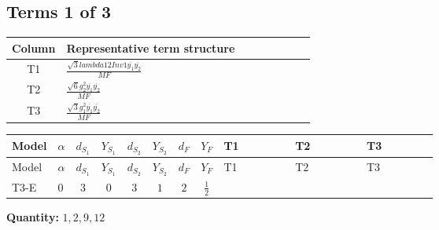 \documentclass[8pt]{article}
\begin{document}
\begin{landscape}
\subsection*{Terms 1 of 3}
\begin{center}
\begin{tabular}{@{}c >{\raggedright\arraybackslash}p{0.82\linewidth}@{}}
\toprule
Column & Representative term structure \\
\midrule
T1 & \(\displaystyle \frac{\sqrt{3} lambda12Inv1 \overline{y_{1}} \overline{y_{2}}}{MF}\) \\
\midrule
T2 & \(\displaystyle \frac{\sqrt{6} g_{2}^{2} \overline{y_{1}} \overline{y_{2}}}{MF}\) \\
\midrule
T3 & \(\displaystyle \frac{\sqrt{3} g_{1}^{2} \overline{y_{1}} \overline{y_{2}}}{MF}\) \\
\midrule
\bottomrule
\end{tabular}
\end{center}
\smallskip
\tiny
\begin{longtable}{@{}llcccccc >{\raggedright\arraybackslash}p{0.21\linewidth} >{\raggedright\arraybackslash}p{0.21\linewidth} >{\raggedright\arraybackslash}p{0.21\linewidth}@{}}
\toprule
Model & $\alpha$ & $d_{S_1}$ & $Y_{S_1}$ & $d_{S_2}$ & $Y_{S_2}$ & $d_F$ & $Y_F$ & T1 & T2 & T3 \\
\midrule
\endfirsthead
\toprule
Model & $\alpha$ & $d_{S_1}$ & $Y_{S_1}$ & $d_{S_2}$ & $Y_{S_2}$ & $d_F$ & $Y_F$ & T1 & T2 & T3 \\
\midrule
\endhead
T3-E & $0$ & $3$ & $0$ & $3$ & $1$ & $2$ & $\frac{1}{2}$ & \scriptsize\adjustbox{max width=\linewidth}{$\begin{gathered} - \frac{\sqrt{3} lambda12Inv1 \overline{y_{1}} \overline{y_{2}}}{6 MF}\end{gathered}$} & \scriptsize\adjustbox{max width=\linewidth}{$\begin{gathered} \frac{\sqrt{6} g_{2}^{2} \overline{y_{1}} \overline{y_{2}}}{6 MF}\end{gathered}$} & \scriptsize\adjustbox{max width=\linewidth}{$\begin{gathered} \frac{\sqrt{3} g_{1}^{2} \overline{y_{1}} \overline{y_{2}}}{8 MF}\end{gathered}$} \\
\midrule
\bottomrule
\end{longtable}
\clearpage
\noindent\textbf{Quantity: }$\mathrm{1,2,9,12}$\par\smallskip

\end{landscape}
\end{document}
